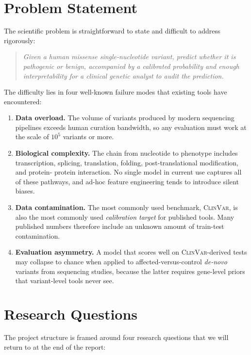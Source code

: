 \documentclass[11pt,a4paper,oneside]{report}
\begin{document}
\section{Problem Statement}
\label{sec:intro-problem}

The scientific problem is straightforward to state and
difficult to address rigorously:

\begin{quote}\itshape
Given a human missense single-nucleotide variant, predict
whether it is pathogenic or benign, accompanied by a
calibrated probability and enough interpretability for a
clinical genetic analyst to audit the prediction.
\end{quote}

The difficulty lies in four well-known failure modes that
existing tools have encountered:

\begin{enumerate}
\item \textbf{Data overload.} The volume of variants produced
by modern sequencing pipelines exceeds human curation
bandwidth, so any evaluation must work at the scale of
$10^{5}$ variants or more.
\item \textbf{Biological complexity.} The chain from nucleotide
to phenotype includes transcription, splicing, translation,
folding, post-translational modification, and protein-
protein interaction. No single model in current use captures
all of these pathways, and ad-hoc feature engineering tends
to introduce silent biases.
\item \textbf{Data contamination.} The most commonly used
benchmark, \textsc{ClinVar}, is also the most commonly used
\emph{calibration target} for published tools. Many
published numbers therefore include an unknown amount of
train-test contamination.
\item \textbf{Evaluation asymmetry.} A model that scores well
on \textsc{ClinVar}-derived tests may collapse to chance
when applied to affected-versus-control \emph{de-novo}
variants from sequencing studies, because the latter
requires gene-level priors that variant-level tools never
see.
\end{enumerate}

\section{Research Questions}
\label{sec:intro-questions}

The project structure is framed around four research questions
that we will return to at the end of the report:
\end{document}
